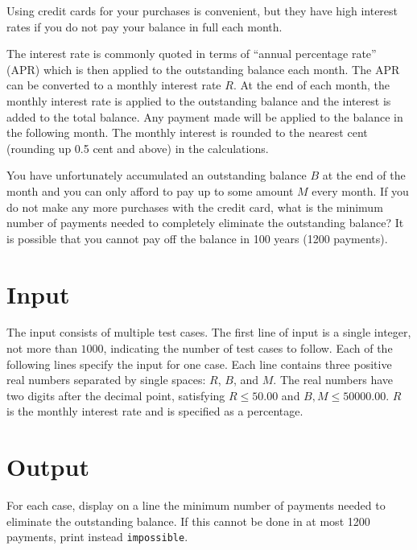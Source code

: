 

Using credit cards for your purchases is convenient, but they have high
interest rates if you do not pay your balance in full each month.

The interest rate is commonly quoted in terms of ``annual percentage
rate'' (APR) which is then applied to the outstanding balance each
month.  The APR can be converted to a monthly interest rate $R$.  At the
end of each month, the monthly interest rate is applied to the
outstanding balance and the interest is added to the total balance.
Any payment made will be applied to the balance in the following
month.  The monthly interest is rounded to the nearest cent (rounding
up 0.5 cent and above) in the calculations.

You have unfortunately accumulated an outstanding balance $B$ at the
end of the month and you can only afford to pay up to some amount $M$
every month.  If you do not make any more purchases with the credit
card, what is the minimum number of payments needed to completely
eliminate the outstanding balance?  It is possible that you cannot pay
off the balance in 100 years (1200 payments).

\section*{Input}

The input consists of multiple test cases. The first line of input 
is a single integer, not more than $1000$, indicating the number
of test cases to follow.  
Each of the following lines specify the input for
one case.  Each line contains three positive real numbers separated by
single spaces: $R$, $B$, and $M$.  The real numbers have two digits after 
the decimal point, satisfying $R \leq 50.00$ and $B, M \leq 50000.00$.
$R$ is the monthly interest rate and is specified as a percentage.

\section*{Output}

For each case, display on a line the minimum number of payments needed
to eliminate the outstanding balance.  If this cannot be done in at
most 1200 payments, print instead \verb|impossible|.
